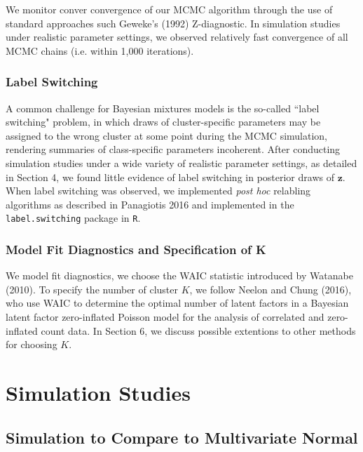 \documentclass[useAMS,referee]{biom}
\begin{document}
We monitor conver convergence of our MCMC algorithm through the use of standard approaches such Geweke's (1992) Z-diagnostic. In simulation studies under realistic parameter settings, we observed relatively fast convergence of all MCMC chains (i.e. within 1,000 iterations).

\subsubsection{Label Switching}

A common challenge for Bayesian mixtures models is the so-called ``label switching" problem, in which draws of cluster-specific parameters may be assigned to the wrong cluster at some point during the MCMC simulation, rendering summaries of class-specific parameters incoherent. After conducting simulation studies under a wide variety of realistic parameter settings, as detailed in Section 4, we found little evidence of label switching in posterior draws of $\mathbf{z}$. When label switching was observed, we implemented \textit{post hoc} relabling algorithms as described in Panagiotis 2016 and implemented in the \texttt{label.switching} package in \texttt{R}.

\subsubsection{Model Fit Diagnostics and Specification of K}

We model fit diagnostics, we choose the WAIC statistic introduced by Watanabe (2010). To specify the number of cluster $K$, we follow Neelon and Chung (2016), who use WAIC to determine the optimal number of latent factors in a Bayesian latent factor zero-inflated Poisson model for the analysis of correlated and zero-inflated count data. In Section 6, we discuss possible extentions to other methods for choosing $K$.

\newpage

\section{Simulation Studies}
\label{s:sim}

\subsection{Simulation to Compare to Multivariate Normal}
\end{document}
